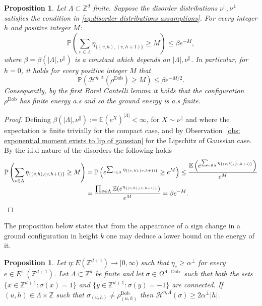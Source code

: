 \documentclass[11pt, reqno]{amsart}
\newtheorem{proposition}[theorem]{Proposition}
\newcommand{\Z}{\mathbb{Z}}
\newcommand{\E}{\mathbb{E}}
\DeclareMathOperator{\Dob}{Dob}
\renewcommand{\P}{\mathbb{P}}
\numberwithin{equation}{section}
\begin{document}
\begin{proposition} \label{prop:ground energy of ground configuration almost surely finite}
Let $\Lambda\subset \Z^{d}$ finite. Suppose the disorder distributions $\nu^{\parallel},\nu^{\perp}$ satisfies the condition in \eqref{eq:disorder distributions assumptions}.  For every integer $h$ and positive integer  $M$:
\begin{equation}\label{eq:exp_decay_h}
\P \left(\sum_{v\in \Lambda} \eta_{\{(v,h),(v,h+1)\}} \geq M\right) \leq \beta e^{-M},
\end{equation}
where $\beta= \beta(|\Lambda|,\nu^{\parallel})$ is a constant which depends on $|\Lambda|,\nu^{\parallel}$.
In particular, for $h=0$, it holds for every positive integer $M$ that
\begin{equation}\label{eq:exp_decay_0}
\P \left(\mathcal{H}^{\eta,\Lambda} (\rho^{\Dob}) \geq M\right) \leq \beta e^{-M/2}.
\end{equation}
Consequently, by the first Borel Cantelli lemma it holds that the configuration $\rho^{\Dob}$ has finite energy a.s and so the ground energy is a.s finite. 
\end{proposition}
\begin{proof}
Defining $\beta(|\Lambda|,\nu^{\parallel}):= \E(e^{X})^{|\Lambda|}<\infty$, for $X\sim \nu^{\parallel}$ and where the expectation is finite trivially for the compact case, and by Observation~\ref{obs: exponential moment exists to lip of gaussian} for the Lipschitz of Gaussian case. By the i.i.d nature of the disorders the following holds 
\begin{align*}
\P \left( \sum_{v\in \Lambda} \eta_{\{(v,h),(v,h+1)\}}\geq M \right)  &=
\P \left( e^{ \sum_{v\in \Lambda} \eta_{\{(v,h),(v,h+1)\}}}  
\geq e^{ M} \right) \leq \frac{\E \left( e^{ \sum_{v\in \Lambda} \eta_{\{(v,h),(v,h+1)\}}} \right)}{e^{M}}\\
&=\frac{\prod_{v\in\Lambda}\E (e^{\eta_{\{(v,h),(v,h+1)\}}})}{e^{M}} = \beta e^{- M}.
\qedhere\end{align*}
\end{proof}

The proposition below states that from the appearance of a sign change in a ground configuration in height $k$ one may deduce a lower bound on the energy of it. 

\begin{proposition}\label{prop: high face of the interface in ground configuration then high ground energy}
Let $\eta: E(\Z^{d+1}) \rightarrow [0,\infty)$ such that  $\eta_{e}\geq {\alpha}^{\perp}$ for every $e\in E^{\perp}(\Z^{d+1})$. Let $\Lambda\subset{\mathbb Z}^d$ be finite and let $\sigma\in\Omega^{\Lambda,\Dob}$ such that both the sets $\{x\in{\mathbb Z}^{d+1}\colon \sigma(x)=1\}$ and $\{y\in{\mathbb Z}^{d+1}\colon \sigma(y)=-1\}$ are connected. 
If $(u,h)\in\Lambda\times{\mathbb Z}$ such that $\sigma_{(u,h)}\neq \rho^{\Dob}_{(u,h)}$ 
then $\mathcal{H}^{\eta,\Lambda}(\sigma ) \geq 2\alpha^{\perp}\lvert h\rvert$.
\end{proposition}
\end{document}
